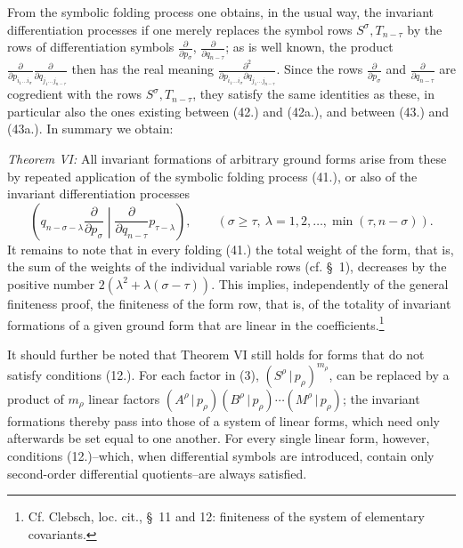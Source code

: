 \documentclass[11pt]{article}
\newcommand{\pair}[2]{(#1\,|\,#2)}
\begin{document}
From the symbolic folding process one obtains, in the usual way, the invariant differentiation processes if one merely replaces the symbol rows $S^\sigma,T_{n-\tau}$ by the rows of differentiation symbols $\frac{\partial}{\partial p_\sigma}$, $\frac{\partial}{\partial q_{n-\tau}}$; as is well known, the product $\frac{\partial}{\partial p_{i_1\ldots i_\sigma}}\frac{\partial}{\partial q_{j_1\ldots j_{n-\tau}}}$ then has the real meaning $\frac{\partial^2}{\partial p_{i_1\ldots i_\sigma}\partial q_{j_1\ldots j_{n-\tau}}}$. Since the rows $\frac{\partial}{\partial p_\sigma}$ and $\frac{\partial}{\partial q_{n-\tau}}$ are cogredient with the rows $S^\sigma,T_{n-\tau}$, they satisfy the same identities as these, in particular also the ones existing between (42.) and (42a.), and between (43.) and (43a.). In summary we obtain:

\emph{Theorem VI:} All invariant formations of arbitrary ground forms arise from these by repeated application of the symbolic folding process (41.), or also of the invariant differentiation processes
\begin{equation}
 \left(q_{n-\sigma-\lambda}\frac{\partial}{\partial p_\sigma}\middle|\frac{\partial}{\partial q_{n-\tau}}p_{\tau-\lambda}\right),
 \qquad(\sigma\ge\tau,\ \lambda=1,2,\ldots,\min(\tau,n-\sigma)).
\tag{45}
\end{equation}
It remains to note that in every folding (41.) the total weight of the form, that is, the sum of the weights of the individual variable rows (cf. \S\ 1), decreases by the positive number $2(\lambda^2+\lambda(\sigma-\tau))$. This implies, independently of the general finiteness proof, the finiteness of the form row, that is, of the totality of invariant formations of a given ground form that are linear in the coefficients.\footnote{Cf. Clebsch, loc. cit., \S\ 11 and 12: finiteness of the system of elementary covariants.}

It should further be noted that Theorem VI still holds for forms that do not satisfy conditions (12.). For each factor in (3), $\pair{S^\rho}{p_\rho}^{m_\rho}$, can be replaced by a product of $m_\rho$ linear factors $\pair{A^\rho}{p_\rho}\pair{B^\rho}{p_\rho}\cdots\pair{M^\rho}{p_\rho}$; the invariant formations thereby pass into those of a system of linear forms, which need only afterwards be set equal to one another. For every single linear form, however, conditions (12.)--which, when differential symbols are introduced, contain only second-order differential quotients--are always satisfied.
\end{document}
